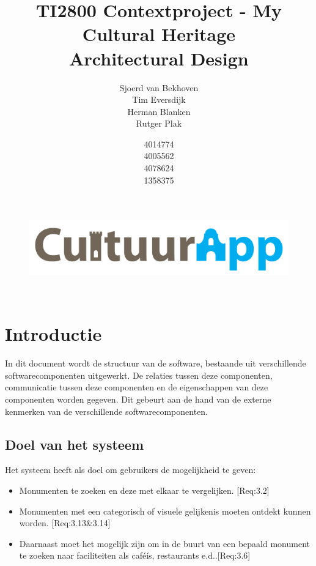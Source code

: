 \documentclass[a4paper,10pt]{article}
\begin{document}
\title{TI2800 Contextproject - My Cultural Heritage\\ Architectural Design}
\author{Sjoerd van Bekhoven\\ Tim Eversdijk \\ Herman Blanken \\ Rutger Plak \and 4014774 \\ 4005562 \\ 4078624 \\ 1358375}

\newcommand{\itemb}[1]{\item \textbf{#1}}

\maketitle
\renewcommand*\contentsname{Inhoudsopgave}

\thispagestyle{empty}
\vspace{10cm}
		\begin{figure}[ht!]
				\centering
				\includegraphics[width=\textwidth]{cultuurapp-logo.png}
			\end{figure}
\clearpage
\setcounter{page}{0} 
\thispagestyle{empty} 
\ 
\clearpage
\tableofcontents
\clearpage


\section{Introductie}
In dit document wordt de structuur van de software, bestaande uit verschillende softwarecomponenten uitgewerkt. De relaties tussen deze componenten, communicatie tussen deze componenten en de eigenschappen van deze componenten worden gegeven. Dit gebeurt aan de hand van de externe kenmerken van de verschillende softwarecomponenten.

	\subsection{Doel van het systeem}
	Het systeem heeft als doel om gebruikers de mogelijkheid te geven:
	\begin{itemize}
		\item Monumenten te zoeken en deze met elkaar te vergelijken. [Req:3.2]
		\item Monumenten met een categorisch of visuele gelijkenis moeten ontdekt kunnen worden. [Req:3.13\&3.14]
		\item Daarnaast moet het mogelijk zijn om in de buurt van een bepaald monument te zoeken naar faciliteiten als caf\'eís, restaurants e.d..[Req:3.6]
	\end{itemize}
	
\end{document}
